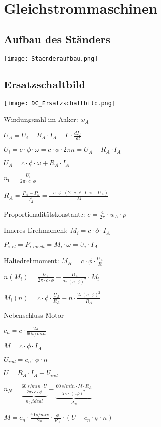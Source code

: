 \documentclass[german]{latex4ei/latex4ei_sheet}
\begin{document}
	\section{Gleichstrommaschinen}
		\begin{sectionbox}
			\subsection{Aufbau des Ständers}
				\texttt{[image: Staenderaufbau.png]}
			\subsection{Ersatzschaltbild}
				\texttt{[image: DC\_Ersatzschaltbild.png]}
				\begin{symbolbox}
					\item Windungszahl im Anker: $w_A$
					\item $U_A = U_i +R_A\cdot I_A+L\cdot \frac{dI_A}{dt}$
					\item $U_i = c\cdot \phi \cdot \omega = c \cdot \phi \cdot 2\pi n = U_A - R_A\cdot I_A$
					\item $U_A = c\cdot \phi \cdot \omega +R_A\cdot I_A$
					\item $n_0 = \frac{U_i}{2\pi\cdot c\cdot \phi}$
					\item $R_A = \frac{P_{el}-P_n}{I_A^2} = \frac{-c\cdot \phi\cdot (2\cdot c\cdot \phi \cdot I\cdot \pi - U_A)}{M}$
					\item Proportionalitätskonstante: $c =\frac{4}{2\pi}\cdot w_A\cdot p$
					\item Inneres Drehmoment: $M_i = c\cdot \phi \cdot I_A$
					\item $ P_{i, el} = P_{i, mech} = M_i \cdot \omega = U_i\cdot I_A$
					\item Haltedrehmoment: $M_H = c\cdot \phi \cdot \frac{U_A}{R}$
					\item $n(M_i) = \frac{U_A}{2\pi\cdot c\cdot \phi}-\frac{R_A}{2\pi(c\cdot \phi)^2}\cdot M_i$
					\item $M_i(n) = c\cdot \phi\cdot \frac{U_A}{R_A}-n\cdot \frac{2\pi(c\cdot \phi)^2}{R_A}$
				\end{symbolbox}

				\begin{bluebox}{Nebenschluss-Motor}
					\item $c_n = c\cdot \frac{2\pi}{60\,s/min}$
					\item $M = c\cdot \phi \cdot I_A$
					\item $U_{ind} = c_n \cdot \phi \cdot n$
					\item $U = R_A\cdot I_A + U_{ind}$
					\item $n_N = \underbrace{\frac{60\,s/min\cdot U}{2\pi\cdot c\cdot \phi}}_{n_0, ideal}-\underbrace{\frac{60\,s/min\cdot M\cdot R_A}{2\pi\cdot(c\phi)^2}}_{\Delta_n}$
					\item $M = c_n\cdot \frac{60\,s/min}{2\pi}\cdot \frac{\phi}{R_A}\cdot (U-c_n\cdot \phi \cdot n)$
				\end{bluebox}


\end{sectionbox}
\end{document}
